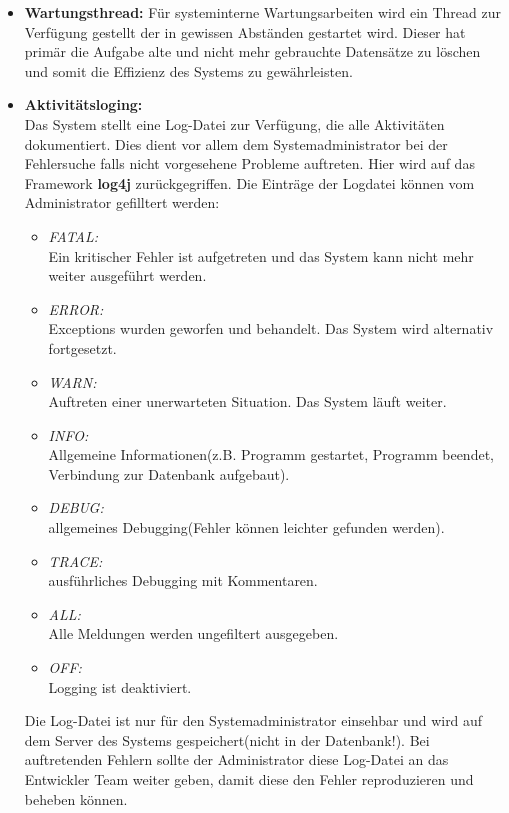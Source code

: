 \begin{itemize}
			\item \textbf{Wartungsthread:}
			Für systeminterne Wartungsarbeiten wird ein Thread zur Verfügung gestellt der in gewissen Abständen gestartet wird. Dieser hat primär die Aufgabe alte und nicht mehr gebrauchte Datensätze zu löschen und somit die Effizienz des Systems zu gewährleisten.
			
			\item \textbf{Aktivitätsloging:}\\
			Das System stellt eine Log-Datei zur Verfügung, die alle Aktivitäten dokumentiert. Dies dient vor allem dem Systemadministrator bei der Fehlersuche falls nicht vorgesehene Probleme auftreten. Hier wird auf das Framework \textbf{log4j} zurückgegriffen. Die Einträge der Logdatei können vom Administrator gefilltert werden:
			\begin{itemize}
				\item \emph{FATAL:}\\
				Ein kritischer Fehler ist aufgetreten und das System kann nicht mehr weiter ausgeführt werden.
				\item \emph{ERROR:}\\
				Exceptions wurden geworfen und behandelt. Das System wird alternativ fortgesetzt.
				\item \emph{WARN:}\\
				Auftreten einer unerwarteten Situation. Das System läuft weiter.
				\item \emph{INFO:}\\
				Allgemeine Informationen(z.B. Programm gestartet, Programm beendet, Verbindung zur Datenbank aufgebaut).
				\item \emph{DEBUG:}\\
				allgemeines Debugging(Fehler können leichter gefunden werden).
				\item \emph{TRACE:}\\
				ausführliches Debugging mit Kommentaren.
				\item \emph{ALL:}\\
				Alle Meldungen werden ungefiltert ausgegeben.
				\item \emph{OFF:}\\
				Logging ist deaktiviert.
			\end{itemize}
			
			Die Log-Datei ist nur für den Systemadministrator einsehbar und wird auf dem Server des Systems gespeichert(nicht in der Datenbank!). Bei auftretenden Fehlern sollte der Administrator diese Log-Datei an das Entwickler Team weiter geben, damit diese den Fehler reproduzieren und beheben können.
			
		\end{itemize} 
	
